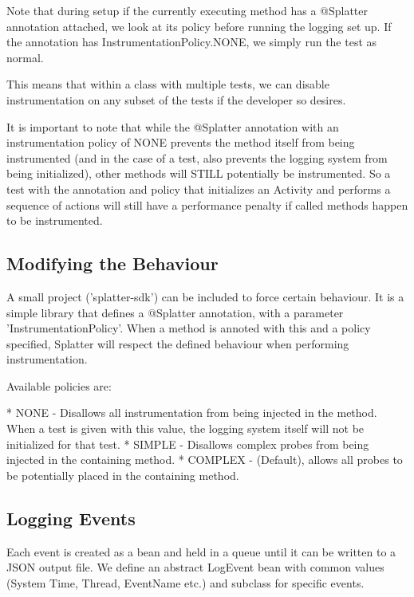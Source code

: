 Note that during setup if the currently executing method has a @Splatter annotation attached, we look at its policy before running the logging set up. If the annotation has InstrumentationPolicy.NONE, we simply run the test as normal.

This means that within a class with multiple tests, we can disable instrumentation on any subset of the tests if the developer so desires.

It is important to note that while the @Splatter annotation with an instrumentation policy of NONE prevents the method itself from being instrumented (and in the case of a test, also prevents the logging system from being initialized), other methods will STILL potentially be instrumented. So a test with the annotation and policy that initializes an Activity and performs a sequence of actions will still have a performance penalty if called methods happen to be instrumented.

\subsection{Modifying the Behaviour}

A small project ('splatter-sdk') can be included to force certain behaviour. It is a simple library that defines a @Splatter annotation, with a parameter 'InstrumentationPolicy'. When a method is annoted with this and a policy specified, Splatter will respect the defined behaviour when performing instrumentation.

Available policies are:

* NONE - Disallows all instrumentation from being injected in the method. When a test is given with this value, the logging system itself will not be initialized for that test.
* SIMPLE - Disallows complex probes from being injected in the containing method.
* COMPLEX - (Default), allows all probes to be potentially placed in the containing method.

\subsection{Logging Events}

Each event is created as a bean and held in a queue until it can be written to a JSON output file. We define an abstract LogEvent bean with common values (System Time, Thread, EventName etc.) and subclass for specific events.

